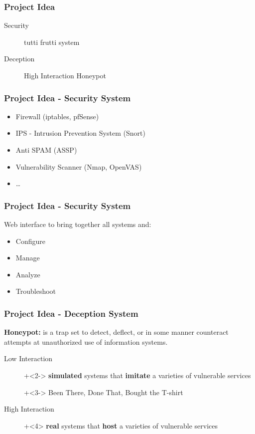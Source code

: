 \documentclass{beamer}
\begin{document}
\begin{frame}\frametitle{Project Idea}
\begin{block}{}
\begin{description}
  \item[Security] {\color{teal}tu}{\color{blue}tti} {\color{orange}fru}{\color{cyan}tti} system
  \item[Deception] High Interaction Honeypot
\end{description}
\end{block}
\end{frame}

\begin{frame}\frametitle{Project Idea - Security System}
\begin{itemize}
  \item Firewall (iptables, pfSense)
  \item IPS - Intrusion Prevention System (Snort)
  \item Anti SPAM (ASSP)
  \item Vulnerability Scanner (Nmap, OpenVAS)
  \item \ldots
\end{itemize}
\end{frame}

\begin{frame}\frametitle{Project Idea - Security System}
Web interface to bring together all systems and:
\begin{itemize}
  \item Configure
  \item Manage
  \item Analyze
  \item Troubleshoot
\end{itemize}
\end{frame}

\begin{frame}\frametitle{Project Idea - Deception System}
\textbf{Honeypot:} is a trap set to detect, deflect, or in some manner counteract attempts at unauthorized use of information systems.
\begin{description}
  \item[Low Interaction]\onslide+<2-> \textbf{simulated} systems that \textbf{imitate} a varieties of vulnerable services
  \item[]\onslide+<3-> Been There, Done That, Bought the T-shirt
  \item[High Interaction]\onslide+<4> \textbf{real} systems that \textbf{host} a varieties of vulnerable services
\end{description}
\end{frame}
\end{document}
